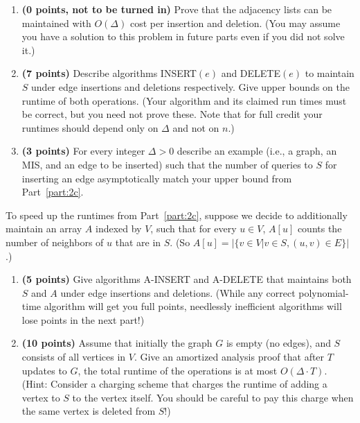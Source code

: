 \documentclass[11pt]{article}
\begin{document}
\begin{enumerate}
\begin{enumerate}[resume]
    \item {\bf (0 points, not to be turned in)} Prove that the adjacency lists can be maintained with $O(\Delta)$ cost per insertion and deletion. (You may assume you have a solution to this problem in future parts even if you did not solve it.)
    \item {\bf (7 points)} Describe algorithms INSERT$(e)$ and DELETE$(e)$ to maintain $S$ under edge insertions and deletions respectively. Give upper bounds on the runtime of both operations. \label{part:2c} (Your algorithm and its claimed run times must be correct, but you need not prove these. Note that for full credit your runtimes should depend only on $\Delta$ and not on $n$.)
    \item {\bf (3 points)} For every integer $\Delta>0$  describe an example (i.e., a graph, an MIS, and an edge to be inserted) such that the number of queries to $S$ for inserting an edge asymptotically match your upper bound from Part~\ref{part:2c}. 
\end{enumerate}

To speed up the runtimes from Part~\ref{part:2c}, suppose we decide to additionally maintain 
an array $A$ indexed by $V$, such that for every $u\in V$, $A[u]$ counts the number of neighbors of $u$ that are in $S$. (So $A[u] = |\{v \in V | v \in S, (u,v) \in E\}|$.) 

\begin{enumerate}[resume]
    \item {\bf (5 points)} Give algorithms A-INSERT and A-DELETE that maintains both $S$ and $A$ under edge insertions and deletions. (While any correct polynomial-time algorithm will get you full points, needlessly inefficient algorithms will lose points in the next part!)
    \item {\bf (10 points)} Assume that initially the graph $G$ is empty (no edges), and $S$ consists of all vertices in $V$. Give an amortized analysis proof that after $T$ updates to $G$, the total runtime of the operations is at most $O(\Delta\cdot T)$. (Hint: Consider a charging scheme that charges the runtime of adding a vertex to $S$ to the vertex itself. You should be careful to pay this charge when the same vertex is deleted from $S$!)
\end{enumerate}

\end{enumerate}
\end{document}
